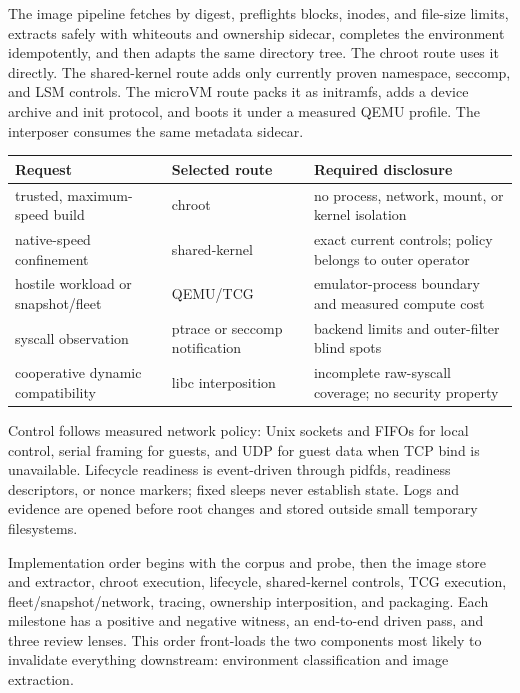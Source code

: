 \documentclass[10pt,twocolumn]{article}
\begin{document}
The image pipeline fetches by digest, preflights blocks, inodes, and file-size limits, extracts safely with whiteouts and ownership sidecar, completes the environment idempotently, and then adapts the same directory tree. The chroot route uses it directly. The shared-kernel route adds only currently proven namespace, seccomp, and LSM controls. The microVM route packs it as initramfs, adds a device archive and init protocol, and boots it under a measured QEMU profile. The interposer consumes the same metadata sidecar.

\begin{table}[t]
\centering\footnotesize
\begin{tabularx}{\textwidth}{>{\raggedright\arraybackslash}X>{\raggedright\arraybackslash}X>{\raggedright\arraybackslash}X}
\toprule
\textbf{Request} & \textbf{Selected route} & \textbf{Required disclosure} \\
\midrule
trusted, maximum-speed build & chroot & no process, network, mount, or kernel isolation \\
native-speed confinement & shared-kernel & exact current controls; policy belongs to outer operator \\
hostile workload or snapshot/fleet & QEMU/TCG & emulator-process boundary and measured compute cost \\
syscall observation & ptrace or seccomp notification & backend limits and outer-filter blind spots \\
cooperative dynamic compatibility & libc interposition & incomplete raw-syscall coverage; no security property \\
\bottomrule
\end{tabularx}
\end{table}
Control follows measured network policy: Unix sockets and FIFOs for local control, serial framing for guests, and UDP for guest data when TCP bind is unavailable. Lifecycle readiness is event-driven through pidfds, readiness descriptors, or nonce markers; fixed sleeps never establish state. Logs and evidence are opened before root changes and stored outside small temporary filesystems.

Implementation order begins with the corpus and probe, then the image store and extractor, chroot execution, lifecycle, shared-kernel controls, TCG execution, fleet/snapshot/network, tracing, ownership interposition, and packaging. Each milestone has a positive and negative witness, an end-to-end driven pass, and three review lenses. This order front-loads the two components most likely to invalidate everything downstream: environment classification and image extraction.
\end{document}
